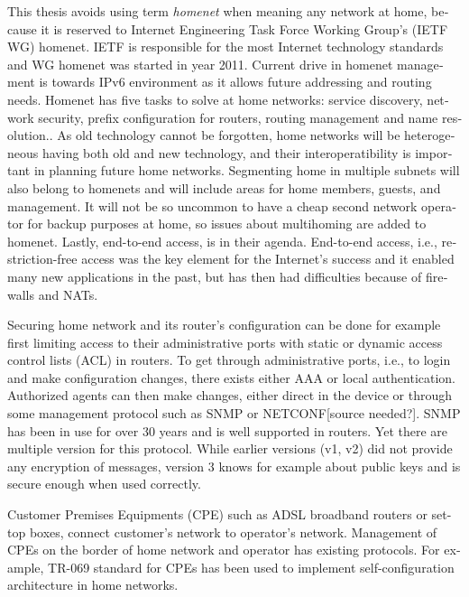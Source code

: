 \documentclass[12pt,a4paper,english]{tutthesis}
\begin{document}
\begin{otherlanguage}{english}
This thesis avoids using term \emph{homenet} when meaning any network at home,
because  it is  reserved to 
Internet Engineering Task Force Working Group's (IETF
WG) homenet. IETF is responsible for the most Internet technology standards and 
WG homenet was started in year 2011.
Current drive in homenet management is towards IPv6 environment
 as it allows future addressing and routing needs. 
Homenet has five tasks to solve at home networks: service discovery, network security, 
prefix configuration for routers, routing management and name
resolution.\cite{homenet-charter}.
As old technology cannot be forgotten, home networks will be heterogeneous having both
old and new technology, and their interoperatibility is important in
planning future home networks. 
Segmenting home in multiple subnets will also belong
to homenets and will include areas for home members, guests,
and management. It will not be so uncommon to have a cheap second
network operator for backup purposes at home, so issues about
multihoming are added to homenet.
Lastly, end-to-end access, is in their
agenda. End-to-end access, i.e., restriction-free access was the key
element for the Internet's success and it enabled many new
applications in the past, but has then had difficulties because of
firewalls and NATs.



Securing home network and its router's configuration can be done for
example first limiting access to their administrative ports
with static or dynamic access control lists (ACL) in
routers. To get through administrative ports, i.e., to login and make
configuration changes, there exists either AAA or local authentication.
Authorized agents can then make changes, either direct in the device or through some
management protocol such as SNMP or NETCONF[source needed?].  SNMP has been in
use for over 30 years and is well supported in routers. Yet there are
multiple version for this protocol. While earlier versions (v1, v2)
did not provide any encryption of messages, version 3 knows for example
about public keys and is secure enough when used correctly.


Customer Premises Equipments (CPE) such as ADSL broadband routers or
set-top boxes, connect customer's network to operator's network.
Management of CPEs on the border of home network and operator has 
existing protocols. For example, TR-069 standard\cite{iptvtr069} for CPEs
has been used to implement self-configuration archi\-tecture in
home networks\cite{tr069rachidi2011}.



\end{otherlanguage}
\end{document}
